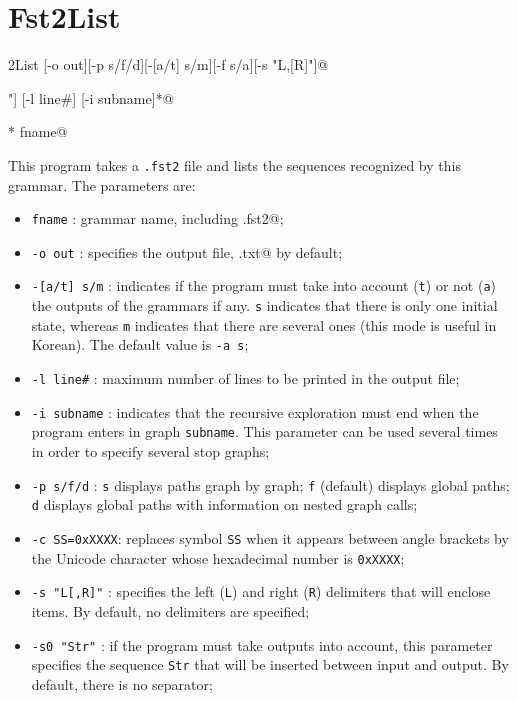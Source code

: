 \section{Fst2List}
\verb@Fst2List [-o out][-p s/f/d][-[a/t] s/m][-f s/a][-s "L,[R]"]@

\verb@         [-s0 "Str"][-v][-rx "L,[R]"] [-l line#] [-i subname]*@

\verb@         [-c SS=0xxxx]* fname@

\bigskip
\noindent This program takes a \verb+.fst2+ file and lists the sequences
recognized by this grammar. The parameters are:

\begin{itemize}
  \item \verb$fname$ : grammar name, including \verb@.fst2@;
  \item \verb$-o out$ : specifies the output file, \verb@lst.txt@ by default;
  \item \verb$-[a/t] s/m$ : indicates if the program must take into account
  (\verb$t$) or not (\verb$a$) the outputs of the grammars if any. \verb$s$
  indicates that there is only one initial state, whereas \verb$m$ indicates that
  there are several ones (this mode is useful in Korean). The default value is
  \verb$-a s$;

  \item \verb$-l line#$ : maximum number of lines to be printed in the output file;
  \item \verb$-i subname$ : indicates that the recursive exploration must end
  when the program enters in graph \verb$subname$. This parameter can be used
  several times in order to specify several stop graphs;

  \item \verb$-p s/f/d$ : \verb$s$ displays paths graph by graph; \verb$f$
  (default) displays global paths; \verb$d$ displays global paths with
  information on nested graph calls;

  \item \verb$-c SS=0xXXXX$: replaces symbol \verb$SS$ when it appears between
  angle brackets by the Unicode character whose hexadecimal number is
  \verb$0xXXXX$;

  \item \verb$-s "L[,R]"$ : specifies the left (\verb$L$) and right (\verb$R$)
  delimiters that will enclose items. By default, no delimiters are specified;

  \item \verb$-s0 "Str"$ : if the program must take  outputs into account, this
  parameter specifies the sequence \verb$Str$ that will be inserted between input
  and output. By default, there is no separator;


\end{itemize}
